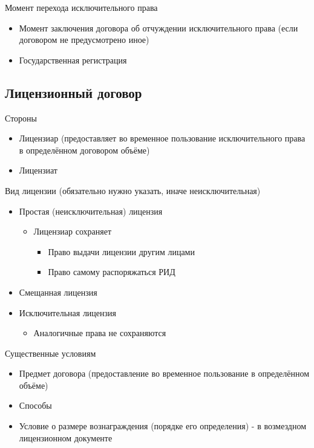 \documentclass[12pt]{article}
\begin{document}
Момент перехода исключительного права
\begin{itemize}
  \item Момент заключения договора об отчуждении исключительного права (если договором не предусмотрено иное)
  \item Государственная регистрация
\end{itemize}

\subsection{Лицензионный договор}

Стороны
\begin{itemize}
  \item Лицензиар (предоставляет во временное пользование исключительного права в определённом договором объёме)
  \item Лицензиат
\end{itemize}

Вид лицензии (обязательно нужно указать, иначе неисключительная)
\begin{itemize}
  \item Простая (неисключительная) лицензия
  \begin{itemize}
    \item Лицензиар сохраняет
    \begin{itemize}
      \item Право выдачи лицензии другим лицами
      \item Право самому распоряжаться РИД
    \end{itemize}
  \end{itemize}
  \item Смещанная лицензия
  \item Исключительная лицензия
  \begin{itemize}
    \item Аналогичные права не сохраняются
  \end{itemize}
\end{itemize}


Существенные условиям
\begin{itemize}
  \item Предмет договора  (предоставление во временное пользование в определённом объёме)
  \item Способы
  \item Условие о размере вознаграждения (порядке его определения) - в возмездном лицензионном документе
\end{itemize}
\end{document}

